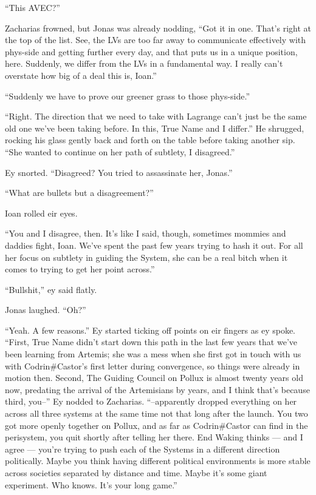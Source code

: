 ``This AVEC?''

Zacharias frowned, but Jonas was already nodding, ``Got it in one. That's right at the top of the list. See, the LVs are too far away to communicate effectively with phys-side and getting further every day, and that puts us in a unique position, here. Suddenly, we differ from the LVs in a fundamental way. I really can't overstate how big of a deal this is, Ioan.''

``Suddenly we have to prove our greener grass to those phys-side.''

``Right. The direction that we need to take with Lagrange can't just be the same old one we've been taking before. In this, True Name and I differ.'' He shrugged, rocking his glass gently back and forth on the table before taking another sip. ``She wanted to continue on her path of subtlety, I disagreed.''

Ey snorted. ``Disagreed? You tried to assassinate her, Jonas.''

``What are bullets but a disagreement?''

Ioan rolled eir eyes.

``You and I disagree, then. It's like I said, though, sometimes mommies and daddies fight, Ioan. We've spent the past few years trying to hash it out. For all her focus on subtlety in guiding the System, she can be a real bitch when it comes to trying to get her point across.''

``Bullshit,'' ey said flatly.

Jonas laughed. ``Oh?''

``Yeah. A few reasons.'' Ey started ticking off points on eir fingers as ey spoke. ``First, True Name didn't start down this path in the last few years that we've been learning from Artemis; she was a mess when she first got in touch with us with Codrin\#Castor's first letter during convergence, so things were already in motion then. Second, The Guiding Council on Pollux is almost twenty years old now, predating the arrival of the Artemisians by years, and I think that's because third, you--'' Ey nodded to Zacharias. ``--apparently dropped everything on her across all three systems at the same time not that long after the launch. You two got more openly together on Pollux, and as far as Codrin\#Castor can find in the perisystem, you quit shortly after telling her there. End Waking thinks — and I agree — you're trying to push each of the Systems in a different direction politically. Maybe you think having different political environments is more stable across societies separated by distance and time. Maybe it's some giant experiment. Who knows. It's your long game.''

